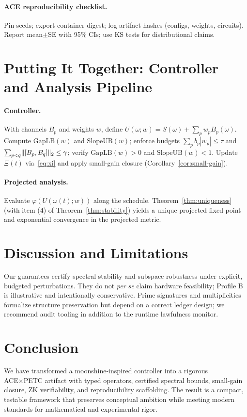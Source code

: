 \documentclass[11pt]{article}
\DeclarePairedDelimiter{\norm}{\lVert}{\rVert}
\newcommand{\GapLB}{\mathrm{GapLB}}
\newcommand{\SlopeUB}{\mathrm{SlopeUB}}
\theoremstyle{plain}
\theoremstyle{definition}
\theoremstyle{remark}
\begin{document}
\paragraph{ACE reproducibility checklist.}
Pin seeds; export container digest; log artifact hashes (configs, weights, circuits). Report mean$\pm$SE with 95\% CIs; use KS tests for distributional claims.

\section{Putting It Together: Controller and Analysis Pipeline}
\label{sec:pipeline}
\paragraph{Controller.} With channels $B_p$ and weights $w$, define $U(\omega;w)=S(\omega)+\sum_p w_pB_p(\omega)$. Compute $\GapLB(w)$ and $\SlopeUB(w)$; enforce budgets $\sum_p b_p|w_p|\le\tau$ and $\sum_{p<q}\norm{[B_p,B_q]}_2\le \gamma$; verify $\GapLB(w)>0$ and $\SlopeUB(w)<1$. Update $\Xi(t)$ via~\eqref{eq:xi} and apply small-gain closure (Corollary~\ref{cor:small-gain}).

\paragraph{Projected analysis.} Evaluate $\varphi\!\left(U(\omega(t);w)\right)$ along the schedule. Theorem~\ref{thm:uniqueness} (with item (4) of Theorem~\ref{thm:stability}) yields a unique projected fixed point and exponential convergence in the projected metric.

\section{Discussion and Limitations}
Our guarantees certify spectral stability and subspace robustness under explicit, budgeted perturbations. They do not \emph{per se} claim hardware feasibility; Profile B is illustrative and intentionally conservative. Prime signatures and multiplicities formalize structure preservation but depend on a correct ledger design; we recommend audit tooling in addition to the runtime lawfulness monitor.

\section{Conclusion}
We have transformed a moonshine-inspired controller into a rigorous ACE×PETC artifact with typed operators, certified spectral bounds, small-gain closure, ZK verifiability, and reproducibility scaffolding. The result is a compact, testable framework that preserves conceptual ambition while meeting modern standards for mathematical and experimental rigor.

\nocite{*}


\end{document}

